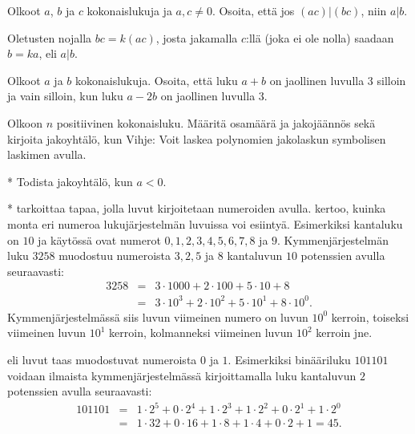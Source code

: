 \begin{kotitehtavasivu}
\begin{tehtava}
	Olkoot $a$, $b$ ja $c$ kokonaislukuja ja $a, c \neq 0$. Osoita, että jos $(ac)|(bc)$, niin $a|b$.
	\begin{vastaus}
	Oletusten nojalla $bc = k(ac)$, josta jakamalla $c$:llä (joka ei ole nolla) saadaan $b = ka$, eli $a | b$.
	\end{vastaus}
\end{tehtava}

\begin{tehtava}
	Olkoot $a$ ja $b$ kokonaislukuja. Osoita, että luku $a + b$ on jaollinen luvulla $3$ silloin ja vain silloin, kun luku $a - 2b$ on jaollinen luvulla $3$.
\end{tehtava}

\begin{tehtava}
	Olkoon $n$ positiivinen kokonaisluku. Määritä osamäärä ja jakojäännös sekä kirjoita jakoyhtälö, kun
	Vihje: Voit laskea polynomien jakolaskun symbolisen laskimen avulla.
\end{tehtava}

\begin{tehtava}
	* Todista jakoyhtälö, kun $a<0$.
\end{tehtava}

\begin{tehtava}
	*  tarkoittaa tapaa, jolla luvut kirjoitetaan numeroiden avulla.  kertoo, kuinka monta eri numeroa lukujärjestelmän luvuissa voi esiintyä. Esimerkiksi  kantaluku on $10$ ja käytössä ovat numerot $0, 1, 2, 3, 4, 5, 6, 7, 8$ ja $9$. Kymmenjärjestelmän luku $3258$ muodostuu numeroista $3, 2, 5$ ja $8$ kantaluvun $10$ potenssien avulla seuraavasti:
	\begin{eqnarray*}
	3258 &=&3\cdot 1000+2\cdot 100+5\cdot 10+8\\
	&=& 3\cdot 10^3+2\cdot 10^2+5\cdot 10^1+8\cdot 10^0.
	\end{eqnarray*}
	Kymmenjärjestelmässä siis luvun viimeinen numero on luvun $10^0$ kerroin, toiseksi viimeinen luvun $10^1$ kerroin, kolmanneksi viimeinen luvun $10^2$ kerroin jne.

	 eli  luvut taas muodostuvat numeroista $0$ ja $1$. Esimerkiksi binääriluku $101101$ voidaan ilmaista kymmenjärjestelmässä kirjoittamalla luku kantaluvun $2$ potenssien avulla seuraavasti:
	\begin{eqnarray*}
	101101&=&1\cdot2^5+0\cdot2^4+1\cdot2^3+1\cdot2^2+0\cdot2^1+1\cdot2^0 \\
	&=& 1\cdot32+0\cdot16+1\cdot8+1\cdot4+0\cdot2+1=45.
	\end{eqnarray*}


\end{tehtava}
\end{kotitehtavasivu}
